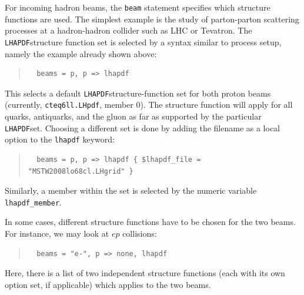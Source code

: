 \documentclass[12pt]{book}
\newcommand{\ttt}[1]{\texttt{#1}}
\newcommand{\lhapdf}{\texttt{LHAPDF}}
\begin{document}
For incoming hadron beams, the \ttt{beam} statement specifies which structure
functions are used.  The simplest example is the study of parton-parton
scattering processes at a hadron-hadron collider such as LHC or Tevatron.  The
\lhapdf structure function set is selected by a syntax similar to process
setup, namely the example already shown above:
\begin{quote}
\begin{footnotesize}
\begin{verbatim}
  beams = p, p => lhapdf
\end{verbatim}
\end{footnotesize}
\end{quote}
This selects a default \lhapdf structure-function set for both proton beams
(currently, \ttt{cteq6ll.LHpdf}, member 0).  The structure function will apply
for all quarks, antiquarks, and the gluon as far as supported by the
particular \lhapdf set.  Choosing a different set is done by adding the
filename as a local option to the \ttt{lhapdf} keyword:
\begin{quote}
\begin{footnotesize}
\begin{verbatim}
  beams = p, p => lhapdf { $lhapdf_file = "MSTW2008lo68cl.LHgrid" }
\end{verbatim}
\end{footnotesize}
\end{quote}
Similarly, a member within the set is selected by the numeric variable
\verb|lhapdf_member|.

In some cases, different structure functions have to be chosen for the two
beams.  For instance, we may look at $ep$ collisions:
\begin{quote}
\begin{footnotesize}
\begin{verbatim}
  beams = "e-", p => none, lhapdf
\end{verbatim}
\end{footnotesize}
\end{quote}
Here, there is a list of two independent structure functions (each with its
own option set, if applicable) which applies to the two beams.
\end{document}
